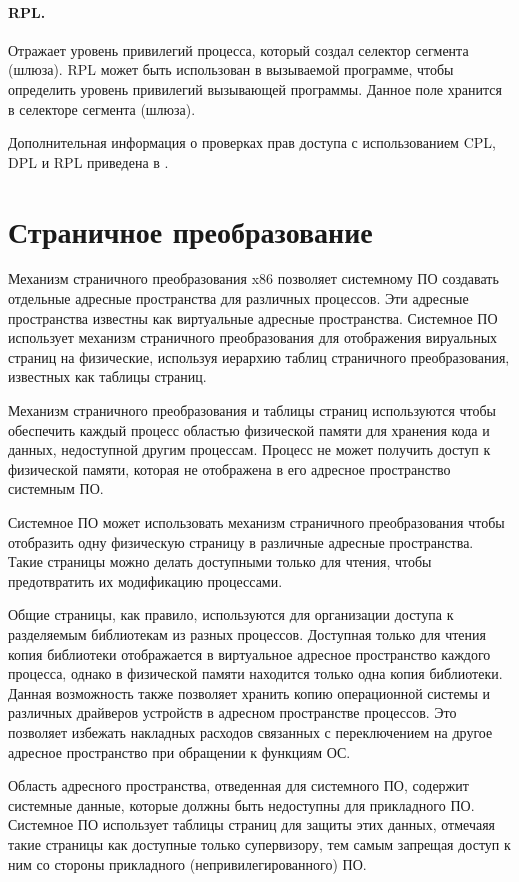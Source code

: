 \paragraph{RPL.} Отражает уровень привилегий процесса, который создал селектор сегмента (шлюза). RPL может быть использован
в вызываемой программе, чтобы определить уровень привилегий вызывающей программы. Данное поле хранится
в селекторе сегмента (шлюза).

Дополнительная информация о проверках прав доступа с использованием CPL, DPL и RPL приведена в \cite{amd_pm_v2}.



\section{Страничное преобразование}
\label{sec:page_translation}
Механизм страничного преобразования x86 позволяет системному ПО создавать отдельные адресные
пространства для различных процессов. Эти адресные пространства известны как
виртуальные адресные пространства. Системное ПО использует механизм страничного преобразования
для отображения вируальных страниц на физические, используя иерархию таблиц страничного преобразования,
известных как таблицы страниц.

Механизм страничного преобразования и таблицы страниц используются чтобы обеспечить
каждый процесс областью физической памяти для хранения кода и данных, недоступной другим процессам.
Процесс не может получить доступ к физической памяти, которая не отображена в его адресное
пространство системным ПО.

Системное ПО может использовать механизм страничного преобразования чтобы отобразить одну физическую
страницу в различные адресные пространства. Такие страницы можно делать доступными только для чтения,
чтобы предотвратить их модификацию процессами.

Общие страницы, как правило, используются для организации доступа к разделяемым библиотекам из
разных процессов. Доступная только для чтения копия библиотеки отображается в виртуальное адресное
пространство каждого процесса, однако в физической памяти находится только одна копия библиотеки.
Данная возможность также позволяет хранить копию операционной системы и различных драйверов устройств
в адресном пространстве процессов. Это позволяет избежать накладных расходов связанных с переключением
на другое адресное пространство при обращении к функциям ОС.

Область адресного пространства, отведенная для системного ПО, содержит системные данные, которые
должны быть недоступны для прикладного ПО. Системное ПО использует таблицы страниц для защиты этих
данных, отмечаяя такие страницы как доступные только супервизору, тем самым запрещая доступ к ним со
стороны прикладного (непривилегированного) ПО.

